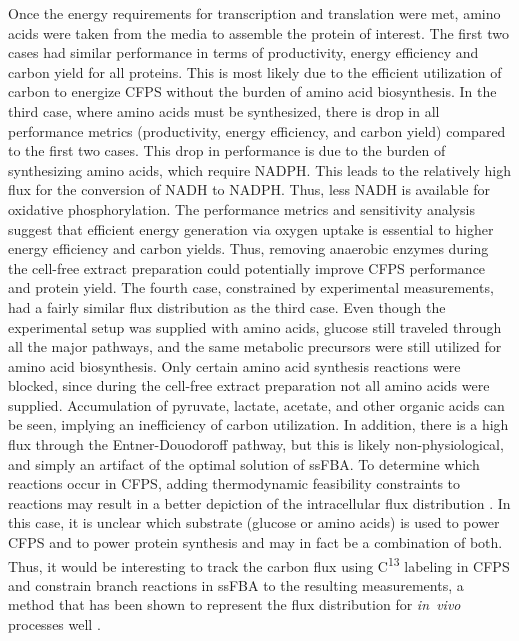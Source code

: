 \documentclass[journal=asbcd6,manuscript=article]{achemso}
\begin{document}
Once the energy requirements for transcription and translation were met, amino acids were taken from the media to assemble the protein of interest.
The first two cases had similar performance in terms of productivity, energy efficiency and carbon yield for all proteins.
This is most likely due to the efficient utilization of carbon to energize CFPS without the burden of amino acid biosynthesis.
In the third case, where amino acids must be synthesized, there is drop in all performance metrics (productivity, energy efficiency, and carbon yield) compared to the first two cases.
This drop in performance is due to the burden of synthesizing amino acids, which require NADPH.
This leads to the relatively high flux for the conversion of NADH to NADPH.
Thus, less NADH is available for oxidative phosphorylation.
The performance metrics and sensitivity analysis suggest that efficient energy generation via oxygen uptake is essential to higher energy efficiency and carbon yields.
Thus, removing anaerobic enzymes during the cell-free extract preparation could potentially improve CFPS performance and protein yield.
The fourth case, constrained by experimental measurements, had a fairly similar flux distribution as the third case.
Even though the experimental setup was supplied with amino acids, glucose still traveled through all the major pathways, and the same metabolic precursors were still utilized for amino acid biosynthesis.
Only certain amino acid synthesis reactions were blocked, since during the cell-free extract preparation not all amino acids were supplied.  
Accumulation of pyruvate, lactate, acetate, and other organic acids can be seen, implying an inefficiency of carbon utilization.
In addition, there is a high flux through the Entner-Douodoroff pathway, but this is likely non-physiological, and simply an artifact of the optimal solution of ssFBA.
To determine which reactions occur in CFPS, adding thermodynamic feasibility constraints to reactions may result in a better depiction of the intracellular flux distribution \cite{Henry:2007,Hamilton:2013}.
In this case, it is unclear which substrate (glucose or amino acids) is used to power CFPS and to power protein synthesis and may in fact be a combination of both.
Thus, it would be interesting to track the carbon flux using C\textsuperscript{13} labeling in CFPS and constrain branch reactions in ssFBA to the resulting measurements, a method that has been shown to represent the flux distribution for \textit{in~vivo} processes well \cite{Zamboni:2009}.
\end{document}

